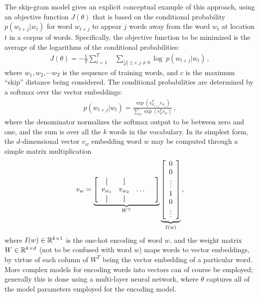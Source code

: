 The skip-gram model gives an explicit conceptual example of this approach, using an objective function $J(\theta)$ that is based on the conditional probability $p(w_{t+j}|w_t)$ for word $w_{t+j}$ to appear $j$ words away from the word $w_t$ at location $t$ in a corpus of words.  Specifically, the objective function to be minimized is the average of the logarithms of the conditional probabilities:
\begin{eqnarray}
  J(\theta) = - \frac{1}{T} \sum_{t=1}^T \ \ \ \ \sum_{|j|\leq c, j\neq 0} \log \ p(w_{t+j}|w_t)
  \,,
\end{eqnarray}
where $w_1, w_2, \cdots w_T$ is the sequence of training words, and $c$ is the maximum ``skip'' distance being considered.  The conditional probabilities are determined by a softmax over the vector embeddings:
\begin{eqnarray}
  p(w_{t+j}|w_t) = \frac{\exp\left( v_{w_{t+j}}^T v_{w_j} \right)}{ \sum_{w} \exp\left( v_w^T v_w \right) }
  \,,
\end{eqnarray}
where the denominator normalizes the softmax output to be between zero and one, and the sum is over all the $k$ words in the vocabulary.  In its simplest form, the $d$-dimensional vector $v_{w}$ embedding word $w$ may be computed through a simple matrix multiplication
\newcommand*{\vertbar}{\rule[-1ex]{0.5pt}{2.5ex}}
\newcommand*{\horzbar}{\rule[.5ex]{2.5ex}{0.5pt}}
\begin{eqnarray}
  v_w = \underbrace{
    \left[
      \begin{array}{cccc}
        \vertbar  & \vertbar  &        & \\
        v_{w_{1}} & v_{w_{2}} & \ldots & \\
        \vertbar  & \vertbar  &        &
      \end{array}
      \right]
  }_{W^T}
  \underbrace{
    \left[
      \begin{array}{c}
        0      \\
        0      \\
        \vdots \\
        1      \\
        0      \\
        \vdots
      \end{array}
      \right]
  }_{I(w)}
  \,,
\end{eqnarray}
where $I(w) \in \mathbb{R}^{k\times 1}$ is the one-hot encoding of word $w$, and the weight matrix $W \in \mathbb{R}^{k\times d}$ (not to be confused with word $w$) maps words to vector embeddings, by virtue of each column of $W^T$ being the vector embedding of a particular word.  More complex models for encoding words into vectors can of course be employed; generally this is done using a multi-layer neural network, where $\theta$ captures all of the model parameters employed for the encoding model.

